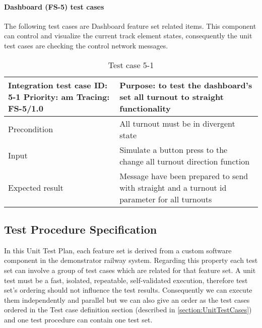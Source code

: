 \paragraph{Dashboard (FS-5) test cases} The following test cases are Dashboard feature set related items. This component can control and visualize the current track element states, consequently the unit test cases are checking the control network messages.
\begin{table}[H]
	\caption{Test case 5-1}
	\label{table:TCase-FS5-01}
	\begin{center}
		\renewcommand{\arraystretch}{1.8}
		\begin{tabu} 
			to 0.9 \textwidth
			{  X[0.4, c] X[c] }
			\toprule
			Integration test case ID: 5-1 \newline Priority: am \newline Tracing: FS-5/1.0 & Purpose: to test the dashboard's set all turnout to straight functionality                   \\ \midrule
			Precondition                                                                   & All turnout must be in divergent state                                                       \\
			Input                                                                          & Simulate a button press to the change all turnout direction function                         \\
			Expected result                                                                & Message have been prepared to send with straight and a turnout id parameter for all turnouts \\ \bottomrule
		\end{tabu}
	\end{center}
\end{table}


\subsection{Test Procedure Specification}
In this Unit Test Plan, each feature set is derived from a custom software component in the demonstrator railway system. Regarding this property each test set can involve a group of test cases which are related for that feature set. A unit test must be a fast, isolated, repeatable, self-validated execution, therefore test set's ordering should not influence the test results. Consequently we can execute them independently and parallel but we can also give an order as the test cases ordered in the Test case definition section (described in \autoref{section:UnitTestCases}) and one test procedure can contain one test set. 

